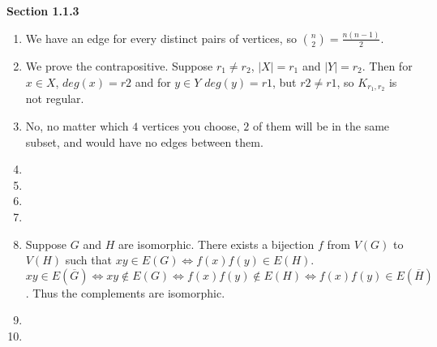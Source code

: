 \documentclass[11pt]{article}
\begin{document}
{\bfseries Section 1.1.3}

\begin{enumerate}[1]
    \item %
        We have an edge for every distinct pairs of vertices, so
        $\binom{n}{2} = \frac{n(n-1)}{2}$.
    \item %
        We prove the contrapositive. Suppose $r_1 \neq r_2$, $|X| = r_1$ and 
        $|Y| = r_2$. Then for $x \in X$, $deg(x) = r2$ and for $y \in Y$ 
        $deg(y) = r1$, but $r2 \neq r1$, so $K_{r_1, r_2}$ is not regular.
    \item %
        No, no matter which $4$ vertices you choose, $2$ of them will be in the 
        same subset, and would have no edges between them. 
    \item %
    \item %

    \item %

    \item %

    \item %
        Suppose $G$ and $H$ are isomorphic. There exists a bijection $f$ from 
        $V(G)$ to $V(H)$ such that $xy \in E(G) \Leftrightarrow f(x)f(y) \in E(H)$. 
        $$xy \in E(\overline{G}) \Leftrightarrow xy \notin E(G) \Leftrightarrow f(x)f(y) \notin E(H) \Leftrightarrow
        f(x)f(y) \in E(\overline{H})$$. Thus the complements are isomorphic.

    \item %
        
    \item %
\end{enumerate}
\end{document}
